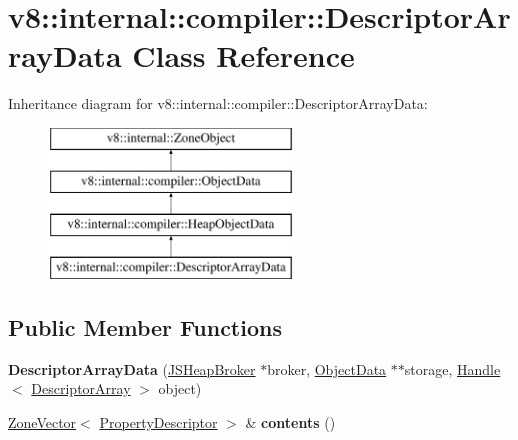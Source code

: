 \hypertarget{classv8_1_1internal_1_1compiler_1_1DescriptorArrayData}{}\section{v8\+:\+:internal\+:\+:compiler\+:\+:Descriptor\+Array\+Data Class Reference}
\label{classv8_1_1internal_1_1compiler_1_1DescriptorArrayData}
Inheritance diagram for v8\+:\+:internal\+:\+:compiler\+:\+:Descriptor\+Array\+Data\+:\begin{figure}[H]
\begin{center}
\leavevmode
\includegraphics[height=4.000000cm]{classv8_1_1internal_1_1compiler_1_1DescriptorArrayData}
\end{center}
\end{figure}
\subsection*{Public Member Functions}
\begin{DoxyCompactItemize}
\item 
\mbox{\label{classv8_1_1internal_1_1compiler_1_1DescriptorArrayData_a0fbe929bca8f167a07cbc68dfd6e8e24}} 
{\bfseries Descriptor\+Array\+Data} (\mbox{\hyperlink{classv8_1_1internal_1_1compiler_1_1JSHeapBroker}{J\+S\+Heap\+Broker}} $\ast$broker, \mbox{\hyperlink{classv8_1_1internal_1_1compiler_1_1ObjectData}{Object\+Data}} $\ast$$\ast$storage, \mbox{\hyperlink{classv8_1_1internal_1_1Handle}{Handle}}$<$ \mbox{\hyperlink{classv8_1_1internal_1_1DescriptorArray}{Descriptor\+Array}} $>$ object)
\item 
\mbox{\label{classv8_1_1internal_1_1compiler_1_1DescriptorArrayData_aa641c0f46364692e6049b0fb10f9f41e}} 
\mbox{\hyperlink{classv8_1_1internal_1_1ZoneVector}{Zone\+Vector}}$<$ \mbox{\hyperlink{structv8_1_1internal_1_1compiler_1_1PropertyDescriptor}{Property\+Descriptor}} $>$ \& {\bfseries contents} ()
\end{DoxyCompactItemize}
